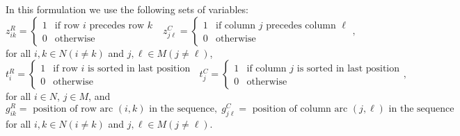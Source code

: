 \documentclass[a4paper,11pt, reqno]{amsart}
\begin{document}
In this formulation we use the following sets of variables:
$$
z^R_{ik} = \begin{cases}
    1 & \mbox{if row $i$ precedes row $k$} \\
    0 & \mbox{otherwise}
\end{cases}\ \ 
~z^C_{j\ell} = \begin{cases}
    1 & \mbox{if column $j$ precedes column $\ell$} \\
    0 & \mbox{otherwise}
\end{cases},
$$
for all $i, k \in N (i\neq k)$ and  $j, \ell \in M (j\neq \ell)$,
$$
t^R_i = \begin{cases}
    1 & \mbox{if row $i$ is sorted in last position } \\
    0 & \mbox{otherwise}
\end{cases}\ 
t^C_j = \begin{cases}
    1 & \mbox{if column $j$ is sorted in last position} \\
    0 & \mbox{otherwise}
\end{cases},
$$
for all $i \in N$, $j \in M$, and
$$
g^R_{ik} = \mbox{ position of row arc $(i,k)$ in the sequence},\; g^C_{j\ell} = \mbox{ position of column arc $(j,\ell)$ in the sequence}\ 
$$
for all $i, k \in N (i\neq k)$ and  $j, \ell \in M (j\neq \ell)$.
\end{document}
